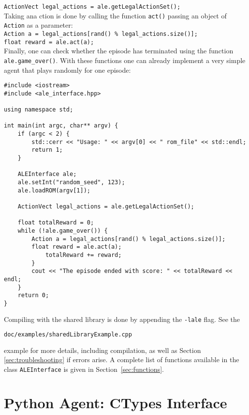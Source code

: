 \documentclass[12pt]{article}
\begin{document}
\verb+ActionVect legal_actions = ale.getLegalActionSet();+\\

Taking ana ction is done by calling the function \verb+act()+ passing an object of \verb+Action+ as a parameter:\\

\verb+Action a = legal_actions[rand() % legal_actions.size()];+\\
\indent \verb+float reward = ale.act(a);+\\

Finally, one can check whether the episode has terminated using the function \verb+ale.game_over()+. With these 
functions one can already implement a very simple agent that plays randomly for one episode:

\begin{verbatim}
#include <iostream>
#include <ale_interface.hpp>

using namespace std;

int main(int argc, char** argv) {
    if (argc < 2) {
        std::cerr << "Usage: " << argv[0] << " rom_file" << std::endl;
        return 1;
    }

    ALEInterface ale;
    ale.setInt("random_seed", 123);
    ale.loadROM(argv[1]);

    ActionVect legal_actions = ale.getLegalActionSet();
    
    float totalReward = 0;
    while (!ale.game_over()) {
        Action a = legal_actions[rand() % legal_actions.size()];    
        float reward = ale.act(a);
            totalReward += reward;
        }
        cout << "The episode ended with score: " << totalReward << endl;
    }
    return 0;
}
\end{verbatim}

Compiling with the shared library is done by appending the \verb+-lale+ flag. 
See the 

\begin{center} \verb+doc/examples/sharedLibraryExample.cpp+\end{center}

example for more details, including compilation, as
well as Section \ref{sec:troubleshooting} if errors arise.
A complete list of functions available in the class \verb+ALEInterface+ is given in Section~\ref{sec:functions}.

\section{Python Agent: CTypes Interface}\label{sec:python_interface}
\end{document}
